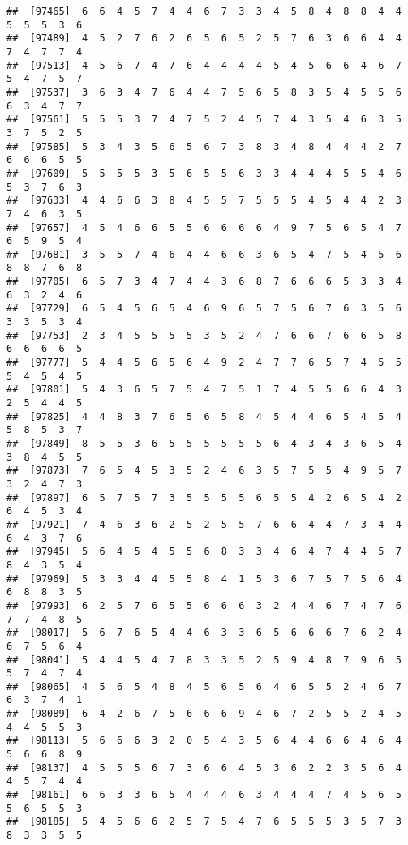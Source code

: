 \documentclass[
]{book}
\begin{document}
\begin{verbatim}
##  [97465]  6  6  4  5  7  4  4  6  7  3  3  4  5  8  4  8  8  4  4  5  5  5  3  6
##  [97489]  4  5  2  7  6  2  6  5  6  5  2  5  7  6  3  6  6  4  4  7  4  7  7  4
##  [97513]  4  5  6  7  4  7  6  4  4  4  4  5  4  5  6  6  4  6  7  5  4  7  5  7
##  [97537]  3  6  3  4  7  6  4  4  7  5  6  5  8  3  5  4  5  5  6  6  3  4  7  7
##  [97561]  5  5  5  3  7  4  7  5  2  4  5  7  4  3  5  4  6  3  5  3  7  5  2  5
##  [97585]  5  3  4  3  5  6  5  6  7  3  8  3  4  8  4  4  4  2  7  6  6  6  5  5
##  [97609]  5  5  5  5  3  5  6  5  5  6  3  3  4  4  4  5  5  4  6  5  3  7  6  3
##  [97633]  4  4  6  6  3  8  4  5  5  7  5  5  5  4  5  4  4  2  3  7  4  6  3  5
##  [97657]  4  5  4  6  6  5  5  6  6  6  6  4  9  7  5  6  5  4  7  6  5  9  5  4
##  [97681]  3  5  5  7  4  6  4  4  6  6  3  6  5  4  7  5  4  5  6  8  8  7  6  8
##  [97705]  6  5  7  3  4  7  4  4  3  6  8  7  6  6  6  5  3  3  4  6  3  2  4  6
##  [97729]  6  5  4  5  6  5  4  6  9  6  5  7  5  6  7  6  3  5  6  3  3  5  3  4
##  [97753]  2  3  4  5  5  5  5  3  5  2  4  7  6  6  7  6  6  5  8  6  6  6  6  5
##  [97777]  5  4  4  5  6  5  6  4  9  2  4  7  7  6  5  7  4  5  5  5  4  5  4  5
##  [97801]  5  4  3  6  5  7  5  4  7  5  1  7  4  5  5  6  6  4  3  2  5  4  4  5
##  [97825]  4  4  8  3  7  6  5  6  5  8  4  5  4  4  6  5  4  5  4  5  8  5  3  7
##  [97849]  8  5  5  3  6  5  5  5  5  5  5  6  4  3  4  3  6  5  4  3  8  4  5  5
##  [97873]  7  6  5  4  5  3  5  2  4  6  3  5  7  5  5  4  9  5  7  3  2  4  7  3
##  [97897]  6  5  7  5  7  3  5  5  5  5  6  5  5  4  2  6  5  4  2  6  4  5  3  4
##  [97921]  7  4  6  3  6  2  5  2  5  5  7  6  6  4  4  7  3  4  4  6  4  3  7  6
##  [97945]  5  6  4  5  4  5  5  6  8  3  3  4  6  4  7  4  4  5  7  8  4  3  5  4
##  [97969]  5  3  3  4  4  5  5  8  4  1  5  3  6  7  5  7  5  6  4  6  8  8  3  5
##  [97993]  6  2  5  7  6  5  5  6  6  6  3  2  4  4  6  7  4  7  6  7  7  4  8  5
##  [98017]  5  6  7  6  5  4  4  6  3  3  6  5  6  6  6  7  6  2  4  6  7  5  6  4
##  [98041]  5  4  4  5  4  7  8  3  3  5  2  5  9  4  8  7  9  6  5  5  7  4  7  4
##  [98065]  4  5  6  5  4  8  4  5  6  5  6  4  6  5  5  2  4  6  7  6  3  7  4  1
##  [98089]  6  4  2  6  7  5  6  6  6  9  4  6  7  2  5  5  2  4  5  4  4  5  5  3
##  [98113]  5  6  6  6  3  2  0  5  4  3  5  6  4  4  6  6  4  6  4  5  6  6  8  9
##  [98137]  4  5  5  5  6  7  3  6  6  4  5  3  6  2  2  3  5  6  4  4  5  7  4  4
##  [98161]  6  6  3  3  6  5  4  4  4  6  3  4  4  4  7  4  5  6  5  5  6  5  5  3
##  [98185]  5  4  5  6  6  2  5  7  5  4  7  6  5  5  5  3  5  7  3  8  3  3  5  5

\end{verbatim}
\end{document}
